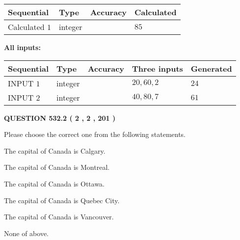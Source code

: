 \documentclass[12pt]{article}
\begin{document}
   
   
   
\noindent{}
   
   
  
  
\noindent\begin{tabular}{|l|l|l|l|}
\hline
 Sequential & Type & Accuracy & Calculated \\ 
\hline
 
 
  Calculated $  1 $ & integer &  & 
  $ 85 $ 
 \\  \hline  
 \end{tabular}
   
   
   
   
\noindent\vspace{0.1in}\hspace{-0.08in} {\textbf{\Large{All inputs: }}}
   
   
  
  
\noindent\begin{tabular}{|l|l|l|l|l|}
\hline
 Sequential & Type & Accuracy & Three inputs & Generated \\ 
\hline
 
 
  INPUT $  1 $ & integer &  & $
 20
 , 
 60
 , 
 2
 $ & $ 24 $ 
 \\  \hline  
 
 
  INPUT $  2 $ & integer &  & $
 40
 , 
 80
 , 
 7
 $ & $ 61 $ 
 \\  \hline  
 \end{tabular}
   
   
  
\vspace{0.2in}
  
{\textbf{\Large{QUESTION
532.2 
 ( 2 , 2 , 201 )
}}}
  
  
Please choose the correct one from the following statements.
 
 
The capital of Canada is Calgary.
 
 
The capital of Canada is Montreal.
 
 
The capital of Canada is Ottawa.
 
 
The capital of Canada is Quebec City.
 
 
The capital of Canada is Vancouver.
 
 
 None of above.
 
 
\noindent{}
 
\end{document}
